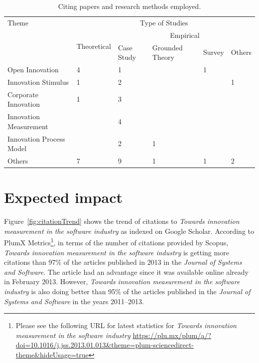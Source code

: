 \documentclass[sigconf,review]{acmart}
\newcommand{\theArticle}{\textit{Towards innovation measurement in the software industry}}
\begin{document}
\begin{table}
\caption{Citing papers and research methods employed.}
\label{tab:papers_method}
\begin{tabular}{p{4cm}p{1.7cm}p{1.7cm}p{3cm}lp{1.7cm}}	\toprule
	Theme & \multicolumn{5}{c}{Type of Studies} \\ \cline{2-6}
          & \multirow{2}{*}{\parbox{2.5cm}{Theoretical}} & \multicolumn{4}{c}{Empirical} \\ \cline{3-6}
                         &             & Case Study & Grounded Theory & Survey & Others \\ \midrule
Open Innovation          & 4           & 1          &                 & 1      &                                                           \\
Innovation Stimulus      & 1           & 2          &                 &        & 1                                                         \\
Corporate Innovation     & 1           & 3          &                 &        &                                                           \\
Innovation Measurement   &             & 4          &                 &        &                                                           \\
Innovation Process Model &             & 2          & 1               &        &                                                           \\
Others                   & 7           & 9          & 1               & 1      & 2              
\\ \bottomrule                                          
\end{tabular}
\end{table}

\section{Expected impact}\label{sec:impact}%

Figure~\ref{fig:citationTrend} shows the trend of citations to \theArticle{} as indexed on Google Scholar. According to PlumX Metrics\footnote{Please see the following URL for latest statistics for \theArticle{} \url{https://plu.mx/plum/a/?doi=10.1016/j.jss.2013.01.013&theme=plum-sciencedirect-theme&hideUsage=true}}, in terms of the number of citations provided by Scopus, \theArticle{} is getting more citations than 97\% of the articles published in 2013 in the \textit{Journal of Systems and Software}. The article had an advantage since it was available online already in February 2013. However, \theArticle{} is also doing better than 95\% of the articles published in the \textit{Journal of Systems and Software} in the years 2011--2013.
\end{document}
